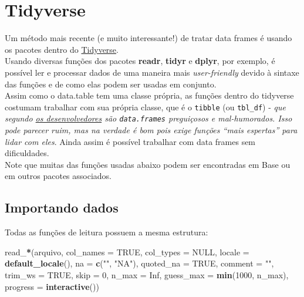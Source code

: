 \documentclass[]{book}
\newenvironment{Shaded}{\begin{snugshade}}{\end{snugshade}}
\newcommand{\KeywordTok}[1]{\textcolor[rgb]{0.13,0.29,0.53}{\textbf{#1}}}
\newcommand{\DataTypeTok}[1]{\textcolor[rgb]{0.13,0.29,0.53}{#1}}
\newcommand{\DecValTok}[1]{\textcolor[rgb]{0.00,0.00,0.81}{#1}}
\newcommand{\StringTok}[1]{\textcolor[rgb]{0.31,0.60,0.02}{#1}}
\newcommand{\OtherTok}[1]{\textcolor[rgb]{0.56,0.35,0.01}{#1}}
\newcommand{\OperatorTok}[1]{\textcolor[rgb]{0.81,0.36,0.00}{\textbf{#1}}}
\newcommand{\NormalTok}[1]{#1}
\theoremstyle{definition}
\theoremstyle{definition}
\theoremstyle{definition}
\theoremstyle{remark}
\begin{document}
\hypertarget{tidyverse}{\section{Tidyverse}\label{tidyverse}}

Um método mais recente (e muito interessante!) de tratar data frames é
usando os pacotes dentro do
\href{https://www.tidyverse.org/}{Tidyverse}.\\
Usando diversas funções dos pacotes \textbf{readr}, \textbf{tidyr} e
\textbf{dplyr}, por exemplo, é possível ler e processar dados de uma
maneira mais \emph{user-friendly} devido à sintaxe das funções e de como
elas podem ser usadas em conjunto.\\
Assim como o data.table tem uma classe própria, as funções dentro do
tidyverse costumam trabalhar com sua própria classe, que é o
\texttt{tibble} (ou \texttt{tbl\_df}) - \emph{que segundo
\href{https://github.com/tidyverse/tibble}{os desenvolvedores} são
\texttt{data.frames} preguiçosos e mal-humorados. Isso pode parecer
ruim, mas na verdade é bom pois exige funções ``mais espertas'' para
lidar com eles}. Ainda assim é possível trabalhar com data frames sem
dificuldades.\\
Note que muitas das funções usadas abaixo podem ser encontradas em Base
ou em outros pacotes associados.

\subsection{Importando dados}\label{importando-dados}

Todas as funções de leitura possuem a mesma estrutura:

\begin{Shaded}
\begin{Highlighting}[]
\NormalTok{read_}\OperatorTok{*}\NormalTok{(arquivo, }
       \DataTypeTok{col_names =} \OtherTok{TRUE}\NormalTok{, }
       \DataTypeTok{col_types =} \OtherTok{NULL}\NormalTok{, }
       \DataTypeTok{locale =} \KeywordTok{default_locale}\NormalTok{(), }
       \DataTypeTok{na =} \KeywordTok{c}\NormalTok{(}\StringTok{""}\NormalTok{, }\StringTok{"NA"}\NormalTok{),}
       \DataTypeTok{quoted_na =} \OtherTok{TRUE}\NormalTok{, }
       \DataTypeTok{comment =} \StringTok{""}\NormalTok{, }
       \DataTypeTok{trim_ws =} \OtherTok{TRUE}\NormalTok{, }
       \DataTypeTok{skip =} \DecValTok{0}\NormalTok{, }
       \DataTypeTok{n_max =} \OtherTok{Inf}\NormalTok{, }
       \DataTypeTok{guess_max =} \KeywordTok{min}\NormalTok{(}\DecValTok{1000}\NormalTok{, n_max), }\DataTypeTok{progress =} \KeywordTok{interactive}\NormalTok{())}
\end{Highlighting}
\end{Shaded}
\end{document}
